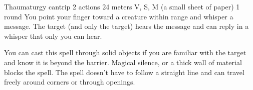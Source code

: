     {Thaumaturgy cantrip}
    {2 actions}
    {24 meters}
    {V, S, M (a small sheet of paper)}
    {1 round}
    You point your finger toward a creature within range and whisper a message.
    The target (and only the target) hears the message and can reply in a whisper that only you can hear.

    You can cast this spell through solid objects if you are familiar with the target and know it is beyond the barrier.
    Magical silence, or a thick wall of material blocks the spell.
    The spell doesn't have to follow a straight line and can travel freely around corners or through openings.
